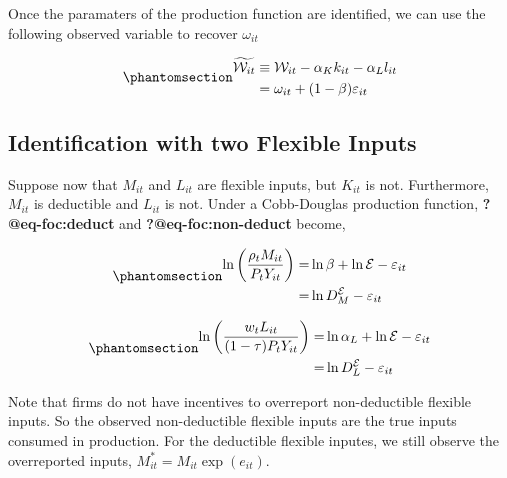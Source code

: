 \documentclass[
  12pt]{article}
\theoremstyle{definition}
\theoremstyle{remark}
\begin{document}
Once the paramaters of the production function are identified, we can
use the following observed variable to recover \(\omega_{it}\)

\begin{equation}\phantomsection\label{eq-w-squiggle}{
\begin{aligned}
    \widetilde{\mathcal W_{it}} & \equiv \mathcal W_{it} - \alpha_K k_{it}-\alpha_L l_{it}\\
    & = \omega_{it}+(1-\beta)\varepsilon_{it}
\end{aligned}
}\end{equation}

\subsection{Identification with two Flexible
Inputs}\label{identification-with-two-flexible-inputs}

Suppose now that \(M_{it}\) and \(L_{it}\) are flexible inputs, but
\(K_{it}\) is not. Furthermore, \(M_{it}\) is deductible and \(L_{it}\)
is not. Under a Cobb-Douglas production function,
\textbf{?@eq-foc:deduct} and \textbf{?@eq-foc:non-deduct} become,

\begin{equation}\phantomsection\label{eq-fs-ded}{
\begin{aligned}    
 \ln\left(\frac{\rho_t M_{it}}{P_t Y_{it}}\right)=&\ln \beta +\ln \mathcal{E} -\varepsilon_{it} \\
 =& \ln D^{\mathcal{E}}_M - \varepsilon_{it} \\
\end{aligned}
}\end{equation}

\begin{equation}\phantomsection\label{eq-fs-non-ded}{
\begin{aligned}
    \ln\left(\frac{w_t L_{it}}{(1-\tau)P_t Y_{it}}\right)=&\ln \alpha_L +\ln \mathcal{E} -\varepsilon_{it} \\
    =& \ln D^{\mathcal{E}}_L - \varepsilon_{it}
\end{aligned}
}\end{equation}

Note that firms do not have incentives to overreport non-deductible
flexible inputs. So the observed non-deductible flexible inputs are the
true inputs consumed in production. For the deductible flexible inputes,
we still observe the overreported inputs,
\(M^*_{it}=M_{it}\exp(e_{it})\).
\end{document}
